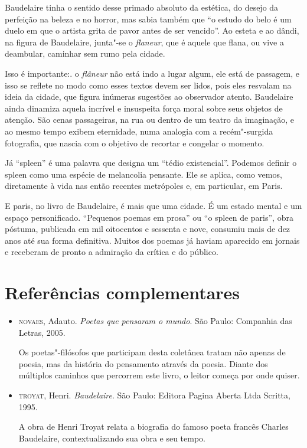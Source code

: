 \documentclass[12pt]{extarticle}
\begin{document}
Baudelaire tinha o sentido desse primado absoluto da estética, do
desejo da perfeição na beleza e no horror, mas sabia também que ``o
estudo do belo é um duelo em que o artista grita de pavor antes de ser
vencido''.
Ao esteta e ao dândi, na figura de Baudelaire, junta"-se o \textit{flaneur},
que é aquele que flana, ou vive a deambular, caminhar sem rumo pela
cidade.

Isso é importante:. o \textit{flâneur} não está indo a lugar algum, ele está de
passagem, e isso se reflete no modo como esses textos devem ser lidos,
pois eles resvalam na ideia da cidade, que figura inúmeras sugestões ao observador atento.
Baudelaire ainda dinamiza aquela incrível e insuspeita força moral sobre
seus objetos de atenção.
São cenas passageiras, na rua ou dentro de um teatro da imaginação, e
ao mesmo tempo exibem eternidade, numa analogia com a recém"-surgida
fotografia, que nascia com o objetivo de recortar e congelar o
momento.

Já ``spleen'' é uma palavra que designa um ``tédio existencial''.
Podemos definir o spleen como uma espécie de melancolia pensante.
Ele se aplica, como vemos, diretamente à vida nas então recentes
metrópoles e, em particular, em Paris.




E paris, no livro de Baudelaire, é mais que uma cidade. É um estado
mental e um espaço personificado.
``Pequenos poemas em prosa'' ou ``o spleen de paris'', obra póstuma,
publicada em mil oitocentos e sessenta e nove, consumiu mais de dez
anos até sua forma definitiva.
Muitos dos poemas já haviam aparecido em jornais e receberam de pronto a
admiração da crítica e do público.

\section{Referências complementares}

\begin{itemize}
\item\textsc{novaes}, Adauto. \textit{Poetas que pensaram o mundo}. São Paulo:
Companhia das Letras, 2005.

Os poetas"-filósofos que participam desta coletânea tratam não apenas de
poesia, mas da história do pensamento através da poesia. Diante dos
múltiplos caminhos que percorrem este livro, o leitor começa por onde
quiser.

\item\textsc{troyat}, Henri. \textit{Baudelaire}. São Paulo: Editora Pagina Aberta Ltda Scritta, 1995.

A obra de Henri Troyat relata a biografia do famoso poeta francês
Charles Baudelaire, contextualizando sua obra e seu tempo.
\end{itemize}
\end{document}
